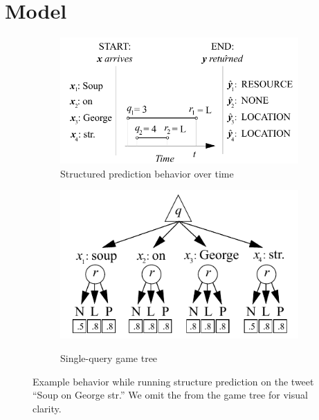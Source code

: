 \section{Model}
\label{sec:model}

\begin{figure}
  \begin{centering}
    \begin{subfigure}[b]{0.58\textwidth}
      \includegraphics[width=\textwidth]{figures/piano-roll.pdf}
      \caption{Structured prediction behavior over time}
    \end{subfigure}
    \hfill
    \begin{subfigure}[b]{0.38\textwidth}
      \includegraphics[width=\textwidth,height=0.23\textheight,keepaspectratio]{figures/single-move.pdf}\\[1.7ex]
      \caption{Single-query game tree}
    \end{subfigure}
  \end{centering}
\caption{Example behavior while running structure prediction on the tweet ``Soup on George str.''
We omit the \scres{} from the game tree for visual clarity.
}
\label{fig:game-tree}
\end{figure}


